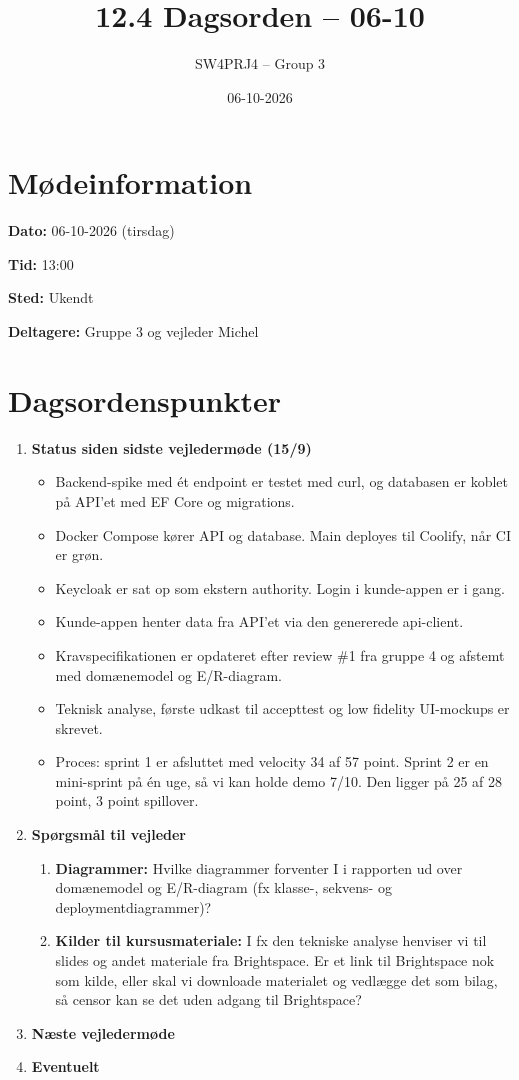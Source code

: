\documentclass[a4paper,11pt]{article}
\title{12.4 Dagsorden -- 06-10}
\author{SW4PRJ4 -- Group 3}
\date{06-10-2026}
\begin{document}
\maketitle

\section*{Mødeinformation}

\textbf{Dato:} 06-10-2026 (tirsdag)

\textbf{Tid:} 13:00

\textbf{Sted:} Ukendt

\textbf{Deltagere:} Gruppe 3 og vejleder Michel

\section*{Dagsordenspunkter}

\begin{enumerate}
    \item \textbf{Status siden sidste vejledermøde (15/9)}
    \begin{itemize}
        \item Backend-spike med ét endpoint er testet med curl, og databasen er koblet på API'et med EF Core og migrations.
        \item Docker Compose kører API og database. Main deployes til Coolify, når CI er grøn.
        \item Keycloak er sat op som ekstern authority. Login i kunde-appen er i gang.
        \item Kunde-appen henter data fra API'et via den genererede api-client.
        \item Kravspecifikationen er opdateret efter review \#1 fra gruppe 4 og afstemt med domænemodel og E/R-diagram.
        \item Teknisk analyse, første udkast til accepttest og low fidelity UI-mockups er skrevet.
        \item Proces: sprint 1 er afsluttet med velocity 34 af 57 point. Sprint 2 er en mini-sprint på én uge, så vi kan holde demo 7/10. Den ligger på 25 af 28 point, 3 point spillover.
    \end{itemize}
    \item \textbf{Spørgsmål til vejleder}
    \begin{enumerate}
        \item \textbf{Diagrammer:} Hvilke diagrammer forventer I i rapporten ud over domænemodel og E/R-diagram (fx klasse-, sekvens- og deploymentdiagrammer)?
        \item \textbf{Kilder til kursusmateriale:} I fx den tekniske analyse henviser vi til slides og andet materiale fra Brightspace. Er et link til Brightspace nok som kilde, eller skal vi downloade materialet og vedlægge det som bilag, så censor kan se det uden adgang til Brightspace?
    \end{enumerate}
    \item \textbf{Næste vejledermøde}
    \item \textbf{Eventuelt}
\end{enumerate}
\end{document}
